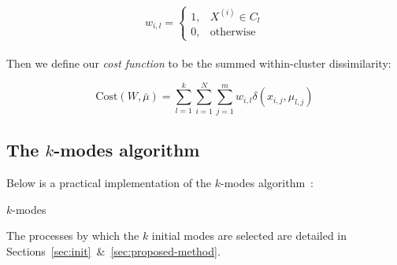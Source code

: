 \[ 
    w_{i,l} = \begin{cases}
                1, & X^{(i)} \in C_l \\
                0, & \text{otherwise}
              \end{cases}
\]\\

Then we define our \emph{cost function} to be the summed within-cluster 
dissimilarity:

\begin{equation}
    \text{Cost}(W, \bar{\mu}) = \sum_{l=1}^{k} \sum_{i=1}^{N} 
                                \sum_{j=1}^{m} w_{i,l} 
                                \delta(x_{i,j}, \mu_{l,j})
\end{equation}


\subsection{The \(k\)-modes algorithm}\label{subsec:kmodes}

Below is a practical implementation of the \(k\)-modes algorithm~\cite{Huang98}:

\begin{algorithm}[H]
    \caption{\(k\)-modes}\label{alg:kmodes}
	\begin{algorithmic}[0] 
        \State{\(\bar{\mu} \gets \emptyset\)}
		\EndFor
		\EndFor
	\end{algorithmic}
\end{algorithm}

\begin{remark}
    The processes by which the \(k\) initial modes are selected are detailed in 
    Sections~\ref{sec:init}~\&~\ref{sec:proposed-method}.
\end{remark}

